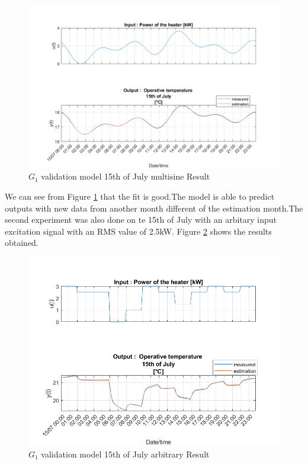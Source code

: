 \documentclass[a4paper,12pt]{article}
\numberwithin{equation}{section}
\begin{document}
\begin{figure}[H]
    \includegraphics[width=\textwidth]{G1_15_07_MS.png}
    \centering
    \caption{$G_{1}$ validation model 15th of July multisine Result}
    \label{fig:G1onedayValidation15/07}
\end{figure}

\noindent
We can see from Figure \ref{fig:G1onedayValidation15/07} that the fit is good.The model is able to predict outputs with new data from another month different of the estimation month.The second experiment was also done on te 15th of July with an arbitary input excitation signal with an RMS value of 2.5kW. Figure \ref{fig:G1onedayValidation15/07Ran} shows the results obtained.

\begin{figure}[H]
    \includegraphics[width=\textwidth]{G1_15_07_RanIn.png}
    \centering
    \caption{$G_{1}$ validation model 15th of July arbitrary Result}
    \label{fig:G1onedayValidation15/07Ran}
\end{figure}
\end{document}
